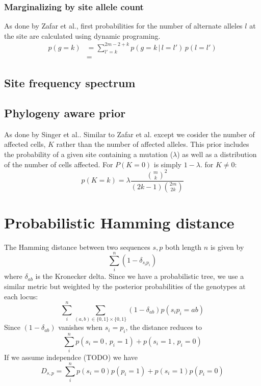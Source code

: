 \documentclass{article}
\begin{document}
\subsubsection*{Marginalizing by site allele count}
As done by Zafar et al., first probabilities for the number of alternate alleles $l$ at the site are calculated using dynamic programing.\\
\begin{align*}
p(g=k) &= \sum\limits_{l'=k}^{2m-2+k} p(g=k \,|\,l=l') \,p(l=l')\\
&=
\end{align*}
\subsection*{Site frequency spectrum}
\subsection*{Phylogeny aware prior}
As done by Singer et al.. Similar to Zafar et al. except we cosider the number of affected cells, $K$ rather than the number of affected alleles. 
This prior includes the probability of a given site containing a mutation ($\lambda$) as well as a distribution of the number of cells affected. For $P(K=0)$ is simply $1-\lambda$. for $K\neq 0 $:
\[p(K=k) = \lambda\frac{\binom{m}{k}^2}{(2k-1)\binom{2m}{2k}}\]

\section{Probabilistic Hamming distance}
The Hamming distance between two sequences $s,p$ both length $n$ is given by \[\sum\limits_i^n (1-\delta_{s_ip_i})\] where $\delta_{ab}$ is the Kronecker delta.
Since we have a probabilistic tree, we use a similar metric but weighted by the posterior probabilities of the genotypes at each locus:
\[\sum\limits_i^n \sum\limits_{(a,b)\in\{0,1\}\times\{0,1\}}(1-\delta_{ab})p(s_ip_i = ab)\]
Since $(1-\delta_{ab})$ vanishes when $s_i = p_i$, the distance reduces to
\[\sum\limits_i^n p(s_i = 0\,,\,p_i=1)+p(s_i=1\,,\,p_i=0)\]
If we assume independce (TODO) we have
\[D_{s,p} = \sum\limits_i^n p(s_i = 0)p(p_i=1)+p(s_i=1)p(p_i=0)\]
\end{document}
